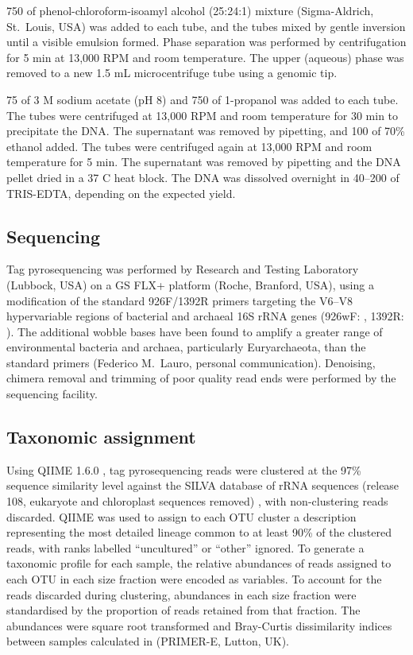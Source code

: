750 \microlitre{} of phenol-chloroform-isoamyl alcohol (25:24:1) mixture (Sigma-Aldrich, St.\ Louis, USA) was added to each tube, and the tubes mixed by gentle inversion until a visible emulsion formed.
Phase separation was performed by centrifugation for 5 min at 13,000 RPM and room temperature.
The upper (aqueous) phase was removed to a new 1.5 mL microcentrifuge tube using a genomic tip.

75 \microlitre{} of 3 M sodium acetate (pH 8) and 750 \microlitre{} of 1-propanol was added to each tube.
The tubes were centrifuged at 13,000 RPM and room temperature for 30 min to precipitate the DNA.
The supernatant was removed by pipetting, and 100 \microlitre{} of 70\% ethanol added.
The tubes were centrifuged again at 13,000 RPM and room temperature for 5 min.
The supernatant was removed by pipetting and the DNA pellet dried in a 37 \textdegree{}C heat block.
The DNA was dissolved overnight in 40--200 \microlitre{} of TRIS-EDTA, depending on the expected yield.

\subsection{Sequencing}

Tag pyrosequencing was performed by Research and Testing Laboratory (Lubbock, USA) on a GS FLX+ platform (Roche, Branford, USA), using a modification of the standard 926F/1392R primers targeting the V6--V8 hypervariable regions of bacterial and archaeal 16S rRNA genes (926wF: , 1392R: ).
The additional wobble bases have been found to amplify a greater range of environmental bacteria and archaea, particularly Euryarchaeota, than the standard primers (Federico M.\ Lauro, personal communication).
Denoising, chimera removal and trimming of poor quality read ends were performed by the sequencing facility.

\subsection{Taxonomic assignment}

Using \ac{QIIME} 1.6.0 \cite{Caporaso:2010ts}, tag pyrosequencing reads were clustered at the 97\% sequence similarity level against the SILVA database of rRNA sequences (release 108, eukaryote and chloroplast sequences removed) \cite{Quast:2013hk}, with non-clustering reads discarded.
\ac{QIIME} was used to assign to each \ac{OTU} cluster a description representing the most detailed lineage common to at least 90\% of the clustered reads, with ranks labelled ``uncultured'' or ``other'' ignored.
To generate a taxonomic profile for each sample, the relative abundances of reads assigned to each \ac{OTU} in each size fraction were encoded as variables.
To account for the reads discarded during clustering, abundances in each size fraction were standardised by the proportion of reads retained from that fraction.
The abundances were square root transformed and Bray-Curtis dissimilarity indices between samples calculated in  (PRIMER-E, Lutton, UK).

